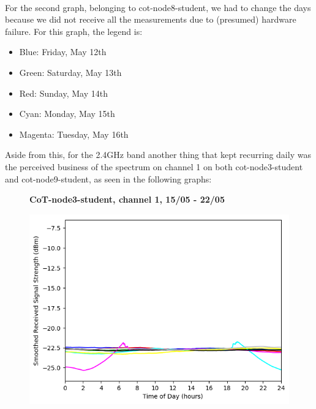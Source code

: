 \documentclass[a4paper, 11pt]{article}
\begin{document}
\\
For the second graph, belonging to cot-node8-student, we had to change the days because we did not receive all the measurements due to (presumed) hardware failure. For this graph, the legend is: 
\begin{itemize}
\setlength\itemsep{-0.4em}
\item Blue: Friday, May 12th	
\item Green: Saturday, May 13th
\item Red: Sunday, May 14th
\item Cyan: Monday, May 15th
\item Magenta: Tuesday, May 16th
\end{itemize}
Aside from this, for the 2.4GHz band another thing that kept recurring daily was the perceived business of the spectrum on channel 1 on both cot-node3-student and cot-node9-student, as seen in the following graphs:
\begin{figure}[h!]
    \centering
    \textbf{CoT-node3-student, channel 1, 15/05 - 22/05}\par\medskip
	\includegraphics[scale=0.5]{images/2_4_GHz/cot-node3-student_2017-05-22_chan1_image.png}
\end{figure}
\end{document}
